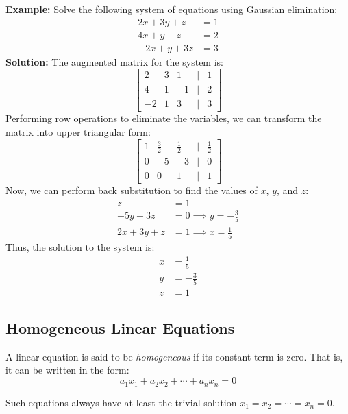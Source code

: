 \textbf{Example:} Solve the following system of equations using Gaussian elimination:
\begin{align*}
	2x + 3y + z  & = 1 \\
	4x + y - z   & = 2 \\
	-2x + y + 3z & = 3
\end{align*}
\textbf{Solution:} The augmented matrix for the system is:
\begin{equation*}
	\begin{bmatrix}
		2  & 3 & 1  & | & 1 \\
		4  & 1 & -1 & | & 2 \\
		-2 & 1 & 3  & | & 3
	\end{bmatrix}
\end{equation*}
Performing row operations to eliminate the variables, we can transform the matrix into upper triangular form:
\begin{equation*}
	\begin{bmatrix}
		1 & \frac{3}{2} & \frac{1}{2} & | & \frac{1}{2} \\
		0 & -5          & -3          & | & 0           \\
		0 & 0           & 1           & | & 1
	\end{bmatrix}
\end{equation*}
Now, we can perform back substitution to find the values of \(x\), \(y\), and \(z\):
\begin{align*}
	z           & = 1                           \\
	-5y - 3z    & = 0 \implies y = -\frac{3}{5} \\
	2x + 3y + z & = 1 \implies x = \frac{1}{5}
\end{align*}
Thus, the solution to the system is:
\begin{align*}
	x & = \frac{1}{5}  \\
	y & = -\frac{3}{5} \\
	z & = 1
\end{align*}

\subsection{Homogeneous Linear Equations}

A linear equation is said to be \emph{homogeneous} if its constant term is zero. That is, it can be written in the form:
\[
	a_1x_1 + a_2x_2 + \cdots + a_nx_n = 0
\]

Such equations always have at least the trivial solution \(x_1 = x_2 = \cdots = x_n = 0\).

